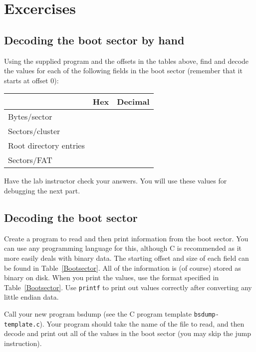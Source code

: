 \documentclass[letterpaper,10pt]{article}
\begin{document}
\section{Excercises}
\subsection{Decoding the boot sector by hand}
Using the supplied program and the offsets in the tables above, find and decode the values for
each of the following fields in the boot sector (remember that it starts at offset 0):
\begin{table}[ht]
\centering
\begin{tabular}{|l|p{2cm}|p{2cm}|}\hline
 & Hex & Decimal\\ \hline
Bytes/sector & & \\ \hline
Sectors/cluster & & \\ \hline
Root directory entries & & \\ \hline
Sectors/FAT & & \\ \hline
\end{tabular}
\end{table}

Have the lab instructor check your answers. You will use these values for debugging the next
part.

\subsection{Decoding the boot sector}
Create a program to read and then print information from the boot sector. You can use any
programming language for this, although C is recommended as it more easily deals with binary
data. The starting offset and size of each field can be found in Table~\ref{Bootsector}.
All of the information is (of course)
stored as binary on disk. When you print the values, use the format specified in Table~\ref{Bootsector}.
Use \verb=printf= to print out values correctly after converting any little endian data.

Call your new program bsdump (see the C program template \verb+bsdump-template.c+).
Your program should take the name of the file to read, and then decode and print out all of the
values in the boot sector (you may skip the jump instruction).
\end{document}
